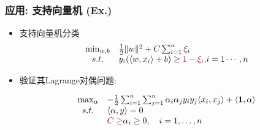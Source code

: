 \documentclass[handout,10pt]{beamer}
\begin{document}
\begin{frame}
  \frametitle{应用: 支持向量机 (Ex.)}

  \begin{itemize}
     

    \item {} 支持向量机分类
    $$
       \begin{array}{cl}
         \min_{w,b} & \frac{1}{2}\|w\|^2 + C \sum_{i=1}^n \xi_i \\
         s.t.  & y_i (\langle w,x_i\rangle +b) \geq \dred{1 -\xi_i,} i=1\cdots,n\\
       \end{array}
      $$

    \item 验证其Lagrange对偶问题:

        $$
       \begin{array}{cl}
         \max_{\alpha} & -\frac{1}{2}\sum_{i=1}^n \sum_{j=1}^n \alpha_i\alpha_j y_iy_j \langle x_i,x_j\rangle + \langle \mathbf{1},\alpha\rangle \\
         s.t.  & \langle \alpha,y\rangle = 0\\
            & \dred{C\geq } \alpha_i \geq 0, \quad i=1,\dots,n\\
       \end{array}
      $$
  \end{itemize}

\end{frame}

%
%
%
%  
%
\end{document}

